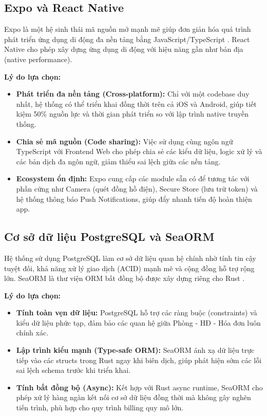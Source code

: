 \subsection{Expo và React Native}
Expo là một hệ sinh thái mã nguồn mở mạnh mẽ giúp đơn giản hóa quá trình phát triển ứng dụng di động đa nền tảng bằng JavaScript/TypeScript \cite{Expo}. React Native cho phép xây dựng ứng dụng di động với hiệu năng gần như bản địa (native performance).

\textbf{Lý do lựa chọn:}
\begin{itemize}
    \item \textbf{Phát triển đa nền tảng (Cross-platform):} Chỉ với một codebase duy nhất, hệ thống có thể triển khai đồng thời trên cả iOS và Android, giúp tiết kiệm 50\% nguồn lực và thời gian phát triển so với lập trình native truyền thống.
    \item \textbf{Chia sẻ mã nguồn (Code sharing):} Việc sử dụng cùng ngôn ngữ TypeScript với Frontend Web cho phép chia sẻ các kiểu dữ liệu, logic xử lý và các bản dịch đa ngôn ngữ, giảm thiểu sai lệch giữa các nền tảng.
    \item \textbf{Ecosystem ổn định:} Expo cung cấp các module sẵn có để tương tác với phần cứng như Camera (quét đồng hồ điện), Secure Store (lưu trữ token) và hệ thống thông báo Push Notifications, giúp đẩy nhanh tiến độ hoàn thiện app.
\end{itemize}

\subsection{Cơ sở dữ liệu PostgreSQL và SeaORM}
Hệ thống sử dụng PostgreSQL \cite{PostgreSQL} làm cơ sở dữ liệu quan hệ chính nhờ tính tin cậy tuyệt đối, khả năng xử lý giao dịch (ACID) mạnh mẽ và cộng đồng hỗ trợ rộng lớn. SeaORM là thư viện ORM bất đồng bộ được xây dựng riêng cho Rust \cite{SeaORM}.

\textbf{Lý do lựa chọn:}
\begin{itemize}
    \item \textbf{Tính toàn vẹn dữ liệu:} PostgreSQL hỗ trợ các ràng buộc (constraints) và kiểu dữ liệu phức tạp, đảm bảo các quan hệ giữa Phòng - HĐ - Hóa đơn luôn chính xác.
    \item \textbf{Lập trình kiểu mạnh (Type-safe ORM):} SeaORM ánh xạ dữ liệu trực tiếp vào các structs trong Rust ngay khi biên dịch, giúp phát hiện sớm các lỗi sai lệch schema trước khi triển khai.
    \item \textbf{Tính bất đồng bộ (Async):} Kết hợp với Rust async runtime, SeaORM cho phép xử lý hàng ngàn kết nối cơ sở dữ liệu đồng thời mà không gây nghẽn tiến trình, phù hợp cho quy trình billing quy mô lớn.
\end{itemize}

